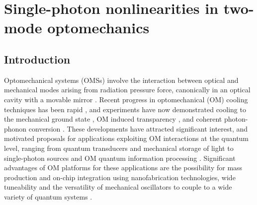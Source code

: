 \chapter{Single-photon nonlinearities in two-mode optomechanics}
\label{ch:Komar2013}


\section{Introduction}
Optomechanical systems (OMSs) involve the interaction between optical and mechanical
modes arising from 
radiation pressure force, canonically in an optical
cavity with a movable mirror \cite{Kippenberg2008,
Marquardt2009, AspelmeyerNJP2008, Genes2009, Favero2009}.
Recent progress in optomechanical (OM) cooling techniques
has been rapid \cite{Metzger2004, Gigan2006, Arcizet2006, Kleckner2006,
Corbitt2007, Schliesser2008,Thompson2008,Wilson2009}, 
and 
experiments have now demonstrated cooling to the
mechanical ground state
\cite{O'Connell2010,Teufel2011,Chan2011},
OM induced transparency \cite{Weis2010,Safavi-Naeini2011},
and coherent
photon-phonon conversion \cite{Fiore2011,Verhagen2011,Hill2012}.
These developments have
attracted significant interest, and
motivated proposals for applications
exploiting OM interactions at the quantum level,
ranging  from
quantum  
 transducers  
 \cite{Stannigel2010,Safavi-Naeini2011a,Regal2011,Taylor2011}
 and mechanical storage of light \cite{Zhang2003, Akram2010,Chang2011}
 to single-photon sources \cite{Rabl2011} and OM quantum information processing 
 \cite{Stannigel2012,Schmidt2012}.
Significant advantages of OM platforms for these 
applications are
 the possibility for mass production and on-chip integration using
 nanofabrication  technologies, %
 wide tuneability 
 and the versatility of mechanical oscillators 
 to
 couple to a wide variety of quantum systems \cite{Schoelkopf2008}.
 
